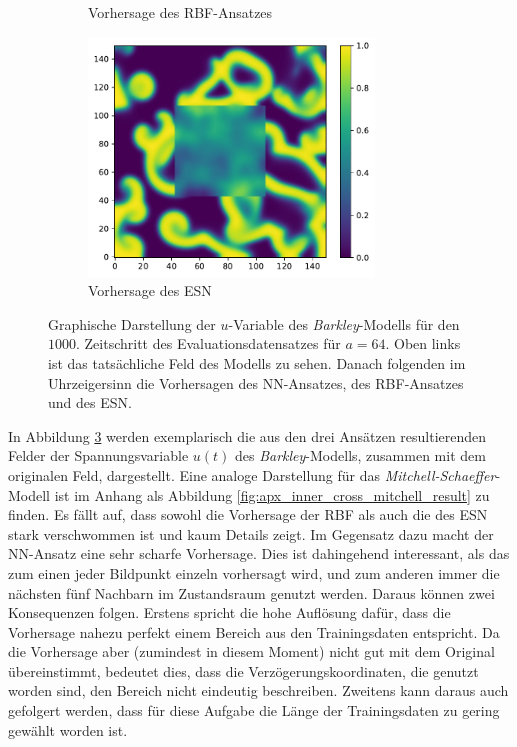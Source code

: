 \begin{figure}[h]
\begin{subfigure}{.5\textwidth}
		\setcapmargin[1cm]{0.5cm}
  		\caption{Vorhersage des \textsc{RBF}-Ansatzes}
  		\label{fig:exp_inner_cross_barkley_result_rbf_pred}
	\end{subfigure}%
	\begin{subfigure}{.5\textwidth}
		\centering
		\includegraphics[height=2.5in]{figures/results/inner_cross_prediction/barkley_u_inner_esn.pdf}
		\setcapmargin[1cm]{0.5cm}
  		\caption{Vorhersage des \textsc{ESN}}
  		\label{fig:exp_inner_cross_barkley_result_esn_pred}
	\end{subfigure}
	\caption{Graphische Darstellung der $u$-Variable des \textit{Barkley}-Modells für den $1000$. Zeitschritt des Evaluationsdatensatzes für $a=64$. Oben links ist das tatsächliche Feld des Modells zu sehen. Danach folgenden im Uhrzeigersinn die Vorhersagen des \textsc{NN}-Ansatzes, des \textsc{RBF}-Ansatzes und des \textsc{ESN}.}
	\label{fig:exp_inner_cross_barkley_result}
\end{figure} 

In Abbildung \ref{fig:exp_inner_cross_barkley_result} werden exemplarisch die aus den drei Ansätzen resultierenden Felder der Spannungsvariable $u(t)$ des \textit{Barkley}-Modells, zusammen mit dem originalen Feld, dargestellt. Eine analoge Darstellung für das \textit{Mitchell-Schaeffer}-Modell ist im Anhang als Abbildung \ref{fig:apx_inner_cross_mitchell_result} zu finden. Es fällt auf, dass sowohl die Vorhersage der \textsc{RBF} als auch die des \textsc{ESN} stark verschwommen ist und kaum Details zeigt. Im Gegensatz dazu macht der \textsc{NN}-Ansatz eine sehr scharfe Vorhersage. Dies ist dahingehend interessant, als das zum einen jeder Bildpunkt einzeln vorhersagt wird, und zum anderen immer die nächsten fünf Nachbarn im Zustandsraum genutzt werden. Daraus können zwei Konsequenzen folgen. Erstens spricht die hohe Auflösung dafür, dass die Vorhersage nahezu perfekt einem Bereich aus den Trainingsdaten entspricht. Da die Vorhersage aber (zumindest in diesem Moment) nicht gut mit dem Original übereinstimmt, bedeutet dies, dass die Verzögerungskoordinaten, die genutzt worden sind, den Bereich nicht eindeutig beschreiben. Zweitens kann daraus auch gefolgert werden, dass für diese Aufgabe die Länge der Trainingsdaten zu gering gewählt worden ist. 
